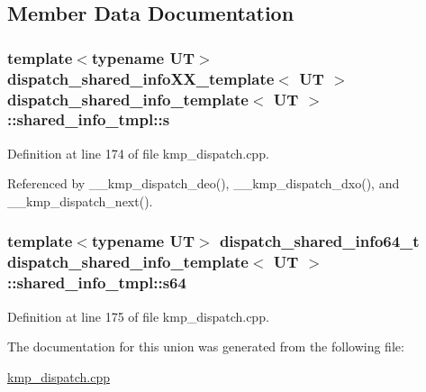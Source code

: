 \subsection{Member Data Documentation}
\hypertarget{uniondispatch__shared__info__template_1_1shared__info__tmpl_ad685051b57b2ee1fd685f627a04621ef}{
\subsubsection[{s}]{\setlength{\rightskip}{0pt plus 5cm}template$<$typename U\-T$>$ {\bf dispatch\-\_\-shared\-\_\-info\-X\-X\-\_\-template}$<$ U\-T $>$ {\bf dispatch\-\_\-shared\-\_\-info\-\_\-template}$<$ U\-T $>$\-::shared\-\_\-info\-\_\-tmpl\-::s}}\label{uniondispatch__shared__info__template_1_1shared__info__tmpl_ad685051b57b2ee1fd685f627a04621ef}


Definition at line 174 of file kmp\-\_\-dispatch.\-cpp.



Referenced by \-\_\-\-\_\-kmp\-\_\-dispatch\-\_\-deo(), \-\_\-\-\_\-kmp\-\_\-dispatch\-\_\-dxo(), and \-\_\-\-\_\-kmp\-\_\-dispatch\-\_\-next().

\hypertarget{uniondispatch__shared__info__template_1_1shared__info__tmpl_afcaf714880dfcdedb3d9e4dc9b6320a0}{
\subsubsection[{s64}]{\setlength{\rightskip}{0pt plus 5cm}template$<$typename U\-T$>$ {\bf dispatch\-\_\-shared\-\_\-info64\-\_\-t} {\bf dispatch\-\_\-shared\-\_\-info\-\_\-template}$<$ U\-T $>$\-::shared\-\_\-info\-\_\-tmpl\-::s64}}\label{uniondispatch__shared__info__template_1_1shared__info__tmpl_afcaf714880dfcdedb3d9e4dc9b6320a0}


Definition at line 175 of file kmp\-\_\-dispatch.\-cpp.



The documentation for this union was generated from the following file\-:\begin{DoxyCompactItemize}
\item 
\hyperlink{kmp__dispatch_8cpp}{kmp\-\_\-dispatch.\-cpp}\end{DoxyCompactItemize}
